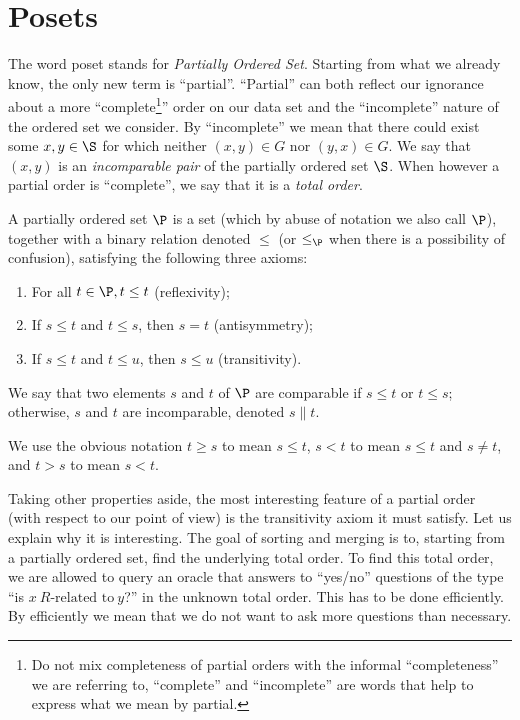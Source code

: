 \section{Posets}

The word poset stands for \emph{Partially Ordered Set}. Starting from
what we already know, the only new term is ``partial''. ``Partial'' can
both reflect our ignorance about a more
``complete\footnote{Do not mix completeness of partial orders with the informal
``completeness'' we are referring to, ``complete'' and ``incomplete''
are words that help to express what we mean by partial.}''
order on our data set
and the ``incomplete'' nature of the ordered set we consider. By
``incomplete'' we mean that there could exist some $x, y \in \S$ for which
neither $(x, y) \in G$ nor $(y, x) \in G$. We say that $(x,y)$ is an
\emph{incomparable pair} of the partially ordered set \(\S\). When however a partial
order is ``complete'', we say that it is a \emph{total order}.
\begin{definition}
A partially ordered set $\P$ is a set (which by abuse of notation we also call
$\P$), together with a binary relation denoted $\leq$ (or $\leq_{\P}$ when there is
a possibility of confusion), satisfying the following three axioms:
\begin{enumerate}
\item For all $t \in \P, t \leq t$ (reflexivity);
\item If $s \leq t$ and $t \leq s$, then $s = t$ (antisymmetry);
\item If $s \leq t$ and $t \leq u$, then $s \leq u$ (transitivity).
\end{enumerate}

We say that two elements $s$ and $t$ of $\P$ are comparable if $s \leq t$ or $t
\leq s$; otherwise, $s$ and $t$ are incomparable, denoted $s \parallel t$.

We use the obvious notation $t \geq s$ to mean $s \leq t$, $s < t$ to mean $s
\leq t$ and $s \neq t$, and $t > s$ to mean $s < t$.
\end{definition}

Taking other properties aside, the most interesting feature of a partial order
(with respect to our point of view) is the transitivity axiom it must satisfy.
Let us explain why it is interesting. The goal of sorting and merging is to,
starting from a partially ordered set, find the underlying total order. To find
this total order, we are allowed to query an oracle that answers to ``yes/no''
questions of the type ``is $x~R\text{-related to}~y$?'' in the unknown total
order. This has to be done efficiently. By efficiently we mean that we do not
want to ask more questions than necessary.

